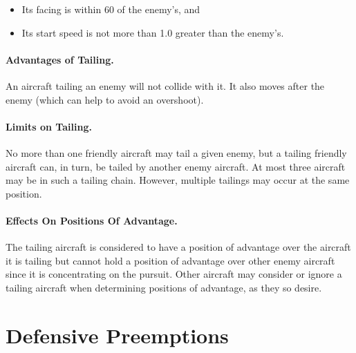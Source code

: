 {\begin{itemize}

    \item Its facing is within 60{\deg} of the enemy's, and
    
    \item Its start speed is not more than 1.0 greater than the enemy's.

\end{itemize}

\paragraph{Advantages of Tailing.} An aircraft tailing an enemy will not collide with it. It also moves after the enemy (which can help to avoid an overshoot).

\paragraph{Limits on Tailing.} No more than one friendly aircraft may tail a given enemy, but a tailing friendly aircraft can, in turn, be tailed by another enemy aircraft. At most three aircraft may be in such a tailing chain. However, multiple tailings may occur at the same position.

\paragraph{Effects On Positions Of Advantage.} The tailing aircraft is considered to have a position of advantage over the aircraft it is tailing but cannot hold a position of advantage over other enemy aircraft since it is concentrating on the pursuit. Other aircraft may consider or ignore a tailing aircraft when determining positions of advantage, as they so desire.
}

\section{Defensive Preemptions}
\label{rule:defensive-preemptions}

